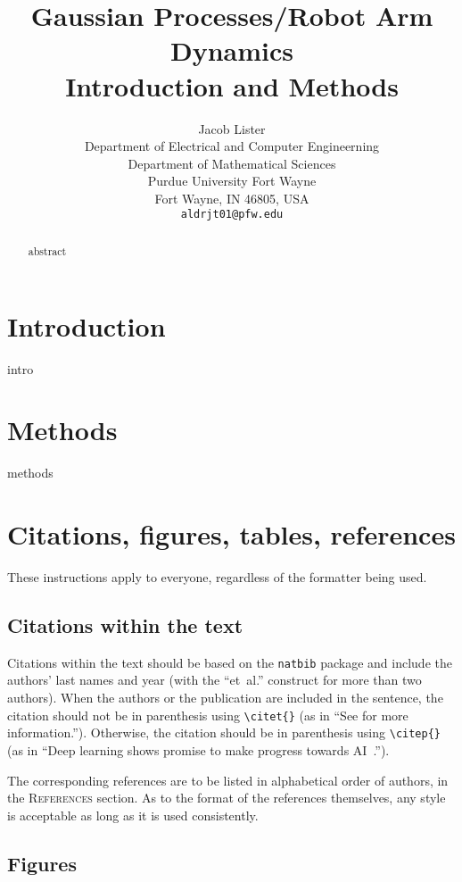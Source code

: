 \documentclass{article}
\title{Gaussian Processes/Robot Arm Dynamics \\ Introduction and Methods}
\author {Jacob Lister                              \\
Department of Electrical and Computer Engineerning \\
Department of Mathematical Sciences                \\
Purdue University Fort Wayne                       \\
Fort Wayne, IN 46805, USA                          \\
\texttt{aldrjt01@pfw.edu}
}
\begin{document}
    \maketitle

    \begin{abstract}
        abstract
    \end{abstract}

    \section{Introduction}

    intro
    
    \section{Methods}
    
    methods

    \section{Citations, figures, tables, references}

    These instructions apply to everyone, regardless of the formatter being used.

    \subsection{Citations within the text}

    Citations within the text should be based on the \texttt{natbib} package
    and include the authors' last names and year (with the ``et~al.'' construct
    for more than two authors). When the authors or the publication are
    included in the sentence, the citation should not be in parenthesis using \verb|\citet{}| (as
    in ``See \citet{Hinton06} for more information.''). Otherwise, the citation
    should be in parenthesis using \verb|\citep{}| (as in ``Deep learning shows promise to make progress
    towards AI~\citep{Bengio+chapter2007}.'').

    The corresponding references are to be listed in alphabetical order of
    authors, in the \textsc{References} section. As to the format of the
    references themselves, any style is acceptable as long as it is used
    consistently.

    \subsection{Figures}
\end{document}
